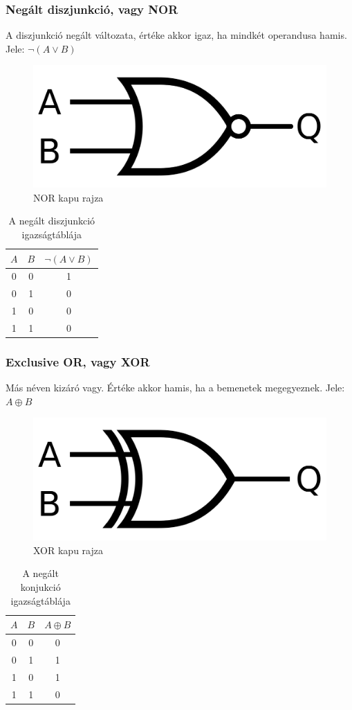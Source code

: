 \documentclass[
]{thesis-ekf}
\theoremstyle{definition}
\theoremstyle{remark}
\begin{document}
\subsubsection{Negált diszjunkció, vagy NOR}
A diszjunkció negált változata, értéke akkor igaz, ha mindkét operandusa hamis. Jele: $\neg(A \lor B)$

\begin{figure}[H]
	\centering
	\includegraphics[width=0.3\linewidth]{nor}
	\caption{NOR kapu rajza}
	\label{fig:nor}
\end{figure}


\begin{table}[H]
	\centering
	\begin{tabular}{c|c|c}
		$A$ & $B$ & $\neg(A \lor B)$\\               
		\hline
		0 & 0 & 1\\
		0 & 1 & 0\\
		1 & 0 & 0\\
		1 & 1 & 0
	\end{tabular}
	\caption{A negált diszjunkció igazságtáblája}
\end{table}


\subsubsection{Exclusive OR, vagy XOR}
Más néven kizáró vagy. Értéke akkor hamis, ha a bemenetek megegyeznek. Jele: $A \oplus B$

\begin{figure}[H]
	\centering
	\includegraphics[width=0.3\linewidth]{xor}
	\caption{XOR kapu rajza}
	\label{fig:xor}
\end{figure}


\begin{table}[H]
	\centering
	\begin{tabular}{c|c|c}
		$A$ & $B$ & $A \oplus B$\\               
		\hline
		0 & 0 & 0\\
		0 & 1 & 1\\
		1 & 0 & 1\\
		1 & 1 & 0
	\end{tabular}
	\caption{A negált konjukció igazságtáblája}
\end{table}
\end{document}
